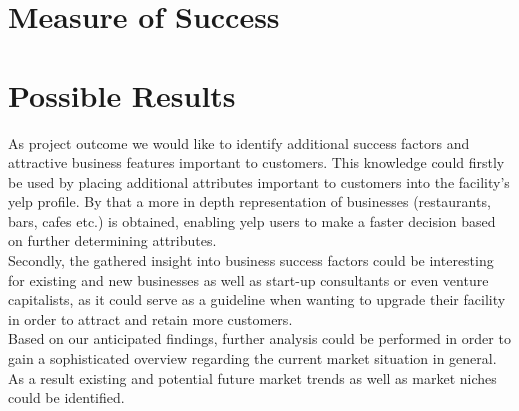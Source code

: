 \section{Measure of Success}
\label{cha:success}


\section{Possible Results}
\label{cha:conclusion}
As project outcome we would like to identify additional success factors and attractive business features important to customers. This knowledge could firstly be used by placing additional attributes important to customers into the facility's yelp profile. By that a more in depth representation of businesses (restaurants, bars, cafes etc.) is obtained, enabling yelp users to make a faster decision based on further determining attributes.\\ 
Secondly, the gathered insight into business success factors could be interesting for existing and new businesses as well as start-up consultants or even venture capitalists, as it could serve as a guideline when wanting to upgrade their facility in order to attract and retain more customers.\\ 
Based on our anticipated findings, further analysis could be performed in order to gain a sophisticated overview regarding the current market situation in general. As a result existing and potential future market trends as well as market niches could be identified.\\ 